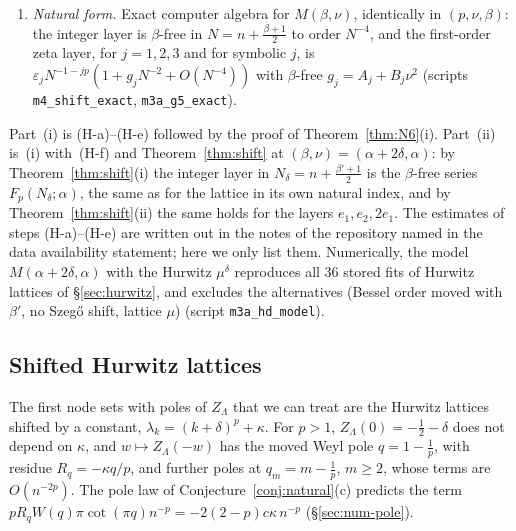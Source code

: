 \begin{enumerate}
using a Cauchy-difference bound on the seam band factor that is uniform in $\delta$. The step to~(i) also needs the linear
response of Lemma~\ref{lem:E37} for $M(\beta,\nu)$; it holds with $d_1=-p(\beta+1)/2$, by the same computation with the residue at $0$
depending on $\nu$ only and the shift at $4c$ on $\beta$ only (verified by exact computer algebra, script \texttt{m3a\_e37\_decoupled}).
\item[(H-f)] \emph{Natural form.} Exact computer algebra for $M(\beta,\nu)$, identically in $(p,\nu,\beta)$: the integer layer is
$\beta$-free in $N=n+\frac{\beta+1}2$ to order $N^{-4}$, and the first-order zeta layer, for $j=1,2,3$ and for symbolic $j$, is
$\varepsilon_jN^{-1-jp}(1+g_jN^{-2}+O(N^{-4}))$ with $\beta$-free $g_j=A_j+B_j\nu^2$ (scripts \texttt{m4\_shift\_exact}, \texttt{m3a\_g5\_exact}).
\end{enumerate}
Part~(i) is (H-a)--(H-e) followed by the proof of Theorem~\ref{thm:N6}(i). Part~(ii) is~(i) with~(H-f) and Theorem~\ref{thm:shift}
at $(\beta,\nu)=(\alpha+2\delta,\alpha)$: by Theorem~\ref{thm:shift}(i) the integer layer in $N_\delta=n+\frac{\beta'+1}2$ is the $\beta$-free series
$F_p(N_\delta;\alpha)$, the same as for the lattice in its own natural index, and by Theorem~\ref{thm:shift}(ii) the same holds for the
layers $e_1,e_2,2e_1$. The estimates of steps (H-a)--(H-e) are written out in the notes of the repository named in the data availability
statement; here we only list them. Numerically, the model $M(\alpha+2\delta,\alpha)$ with the Hurwitz $\mu^\delta$ reproduces all $36$
stored fits of Hurwitz lattices of \S\ref{sec:hurwitz}, and excludes the alternatives (Bessel order moved with $\beta'$, no Szeg\H{o}
shift, lattice $\mu$) (script \texttt{m3a\_hd\_model}).

\subsection{Shifted Hurwitz lattices}\label{sec:kappa}
The first node sets with poles of $Z_\Lambda$ that we can treat are the Hurwitz lattices shifted by a constant,
$\lambda_k=(k+\delta)^p+\kappa$. For $p>1$, $Z_\Lambda(0)=-\frac12-\delta$ does not depend on $\kappa$, and $w\mapsto Z_\Lambda(-w)$ has the
moved Weyl pole $q=1-\frac1p$, with residue $R_q=-\kappa q/p$, and further poles at $q_m=m-\frac1p$, $m\ge2$, whose terms are
$O(n^{-2p})$. The pole law of Conjecture~\ref{conj:natural}(c) predicts the term $pR_qW(q)\pi\cot(\pi q)n^{-p}=-2(2-p)c\kappa\,n^{-p}$
(\S\ref{sec:num-pole}).

